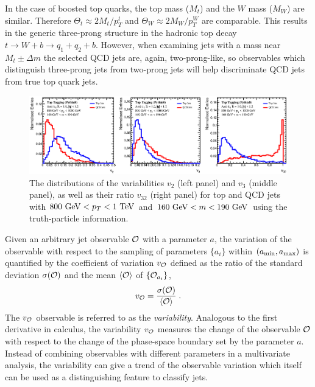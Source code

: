\documentclass[aps,prl,floatfix,preprintnumbers,twocolumn,groupedaddress,nofootinbib]{revtex4-1}
\newcommand{\be}{\begin{equation}}
\newcommand{\ee}{\end{equation}}
\begin{document}
In the case of boosted top quarks, the top mass ($M_t$) and the $W$ mass ($M_W$) are similar. Therefore $\Theta_t \approx 2M_t/p_T^t$ and $\Theta_W \approx 2M_W/p_T^W$ are comparable. This results in the generic three-prong structure in the hadronic top decay $t\rightarrow W+b \rightarrow q_1+q_2+b$. However, when examining jets with a mass near $M_t\pm \Delta m$ the selected QCD jets are, again, two-prong-like, so observables which distinguish three-prong jets from two-prong jets will help discriminate QCD jets from true top quark jets.

\begin{figure}
    \includegraphics[width=2\columnwidth]{plots/Top_vs_high.eps}
    \caption{The distributions of the variabilities $v_2$ (left panel) and $v_3$ (middle panel), as well as their ratio $v_{32}$ (right panel) for top and QCD jets with $800~{\rm GeV} < p_T < 1~{\rm TeV}$ and $160~{\rm GeV} < m < 190~{\rm GeV}$ using the truth-particle information.}
\label{v42}
\end{figure}

Given an arbitrary jet observable $\cal O$ with a parameter $a$,
the variation of the observable with respect to the sampling of parameters $\{a_i\}$ within $(a_{\rm min},a_{\rm max})$ is quantified by the coefficient of variation $v_{\cal O}$ defined as the ratio of the standard deviation $\sigma({\cal O})$ and the mean $\langle {\cal O}\rangle$ of $\{{\cal O}_{a_i}\}$,
\be
    v_{\cal O} = \frac{\sigma({\cal O})}{\langle {\cal O}\rangle}\;.
\ee
The $v_{\cal O}$ observable is referred to as the {\sl variability}. Analogous to the first derivative in calculus, the variability $v_{\cal O}$ measures the change of the observable $\cal O$ with respect to the change of the phase-space boundary set by the parameter $a$. Instead of combining observables with different parameters in a multivariate analysis, the variability can give a trend of the observable variation which itself can be used as a distinguishing feature to classify jets.
\end{document}
